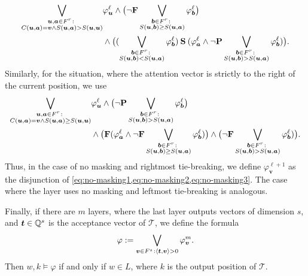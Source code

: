 \begin{equation}\label{eq:no-masking2}
\begin{split}
\bigvee_{\substack{\bm u,\bm a \in F^r \colon\\ 
C(\bm u,\bm a) = \bm v \wedge S(\bm u,\bm a) > S(\bm u,\bm u)}} &\varphi_{\bm u}^\ell \wedge
\big(\neg\textbf{F}\bigvee_{\substack{\bm b \in F^r \colon\\ S(\bm u,\bm b) \ge S(\bm u,\bm a)}} 
\varphi_{\bm b}^\ell\big) \\&\wedge
\big((\bigvee_{\substack{\bm b \in F^r \colon\\ S(\bm u,\bm b) < S(\bm u,\bm a)}} \varphi_{\bm b}^\ell) \mathbin{\textbf{S}}
(\varphi_{\bm a}^\ell \wedge \neg\textbf{P} \bigvee_{\substack{\bm b \in F^r \colon\\ S(\bm u,\bm b) > S(\bm u,\bm a)}} 
\varphi_{\bm b}^\ell)\big).
\end{split}
\end{equation}
Similarly, for the situation, where the attention vector is strictly to the right of the current position, we use
\begin{equation}\label{eq:no-masking3}
\begin{split}
\bigvee_{\substack{\bm u,\bm a \in F^r \colon\\ 
C(\bm u,\bm a) = \bm v \wedge S(\bm u,\bm a) \ge S(\bm u,\bm u)}} &\varphi_{\bm u}^\ell \wedge
\big(\neg\textbf{P}\bigvee_{\substack{\bm b \in F^r \colon\\ S(\bm u,\bm b) > S(\bm u,\bm a)}} 
\varphi_{\bm b}^\ell\big) \\&\wedge
\big(\textbf{F} (\varphi_{\bm a}^\ell \wedge \neg\textbf{F} \bigvee_{\substack{\bm b \in F^r \colon\\ S(\bm u,\bm b) \ge S(\bm u,\bm a)}} 
\varphi_{\bm b}^\ell)\big) \wedge
\big(\neg\textbf{F} \bigvee_{\substack{\bm b \in F^r \colon\\ S(\bm u,\bm b) > S(\bm u,\bm a)}} 
\varphi_{\bm b}^\ell)\big).
\end{split}
\end{equation}
Thus, in the case of no masking and rightmost tie-breaking, we define $\varphi_{\bm v}^{\ell+1}$ 
as the disjunction of \cref{eq:no-masking1,eq:no-masking2,eq:no-masking3}.
The case where the layer uses no masking and leftmost tie-breaking is analogous.

Finally, if there are $m$ layers, where the last layer outputs vectors of dimension $s$, 
and $\bm t \in \mathbb{Q}^s$ is the acceptance vector of $\mathcal{T}$, we define the formula
\[\varphi := \bigvee_{\bm v \in F^s \colon \\ \langle \bm t,\bm v\rangle > 0} \varphi_{\bm v}^m.\]
Then $w,k \models \varphi$ if and only if $w \in L$, where $k$ is the output position of $\mathcal{T}$.

